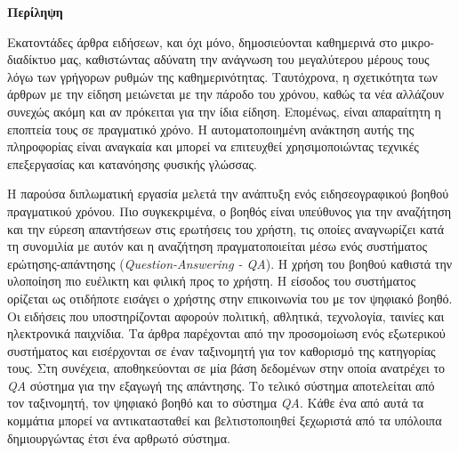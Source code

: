 \begin{center}
  \centering

  \vspace{0.5cm}
  \centering
  \textbf{\Large{Περίληψη}}

  \vspace{1cm}

\end{center}

Εκατοντάδες άρθρα ειδήσεων, και όχι μόνο, δημοσιεύονται καθημερινά στο μικρο-διαδίκτυο μας, καθιστώντας αδύνατη την ανάγνωση του μεγαλύτερου μέρους τους λόγω των γρήγορων ρυθμών της καθημερινότητας. Ταυτόχρονα, η σχετικότητα των άρθρων με την είδηση μειώνεται με την πάροδο του χρόνου, καθώς τα νέα αλλάζουν συνεχώς ακόμη και αν πρόκειται για την ίδια είδηση. Επομένως, είναι απαραίτητη η εποπτεία τους σε πραγματικό χρόνο. Η αυτοματοποιημένη ανάκτηση αυτής της πληροφορίας είναι αναγκαία και μπορεί να επιτευχθεί χρησιμοποιώντας τεχνικές επεξεργασίας και κατανόησης φυσικής γλώσσας.

Η παρούσα διπλωματική εργασία μελετά την ανάπτυξη ενός ειδησεογραφικού βοηθού πραγματικού χρόνου. Πιο συγκεκριμένα, ο βοηθός είναι υπεύθυνος για την αναζήτηση και την εύρεση απαντήσεων στις ερωτήσεις του χρήστη, τις οποίες αναγνωρίζει κατά τη συνομιλία με αυτόν και η αναζήτηση πραγματοποιείται μέσω ενός συστήματος ερώτησης-απάντησης (\emph{Question-Answering - QA}). Η χρήση του βοηθού καθιστά την υλοποίηση πιο ευέλικτη και φιλική προς το χρήστη. Η είσοδος του συστήματος ορίζεται ως οτιδήποτε εισάγει ο χρήστης στην επικοινωνία του με τον ψηφιακό βοηθό. Οι ειδήσεις που υποστηρίζονται αφορούν πολιτική, αθλητικά, τεχνολογία, ταινίες και ηλεκτρονικά παιχνίδια. Τα άρθρα παρέχονται από την προσομοίωση ενός εξωτερικού συστήματος και εισέρχονται σε έναν ταξινομητή για τον καθορισμό της κατηγορίας τους. Στη συνέχεια, αποθηκεύονται σε μία βάση δεδομένων στην οποία ανατρέχει το \emph{QA} σύστημα για την εξαγωγή της απάντησης. Το τελικό σύστημα αποτελείται από τον ταξινομητή, τον ψηφιακό βοηθό και το σύστημα \emph{QA}. Κάθε ένα από αυτά τα κομμάτια μπορεί να αντικατασταθεί και βελτιστοποιηθεί ξεχωριστά από τα υπόλοιπα δημιουργώντας έτσι ένα αρθρωτό σύστημα.

